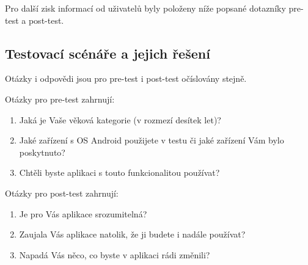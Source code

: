 \documentclass[thesis=B,czech]{FITthesis}[2013/10/20]
\begin{document}
Pro další zisk informací od uživatelů byly položeny níže popsané dotazníky pre-test a post-test.

\subsection{Testovací scénáře a jejich řešení}

Otázky i odpovědi jsou pro pre-test i post-test očíslovány stejně.

Otázky pro pre-test zahrnují:
\begin{enumerate}
  \item Jaká je Vaše věková kategorie (v rozmezí desítek let)?
  \item Jaké zařízení s OS Android použijete v testu či jaké zařízení Vám bylo poskytnuto?
  \item Chtěli byste aplikaci s touto funkcionalitou používat?
\end{enumerate}

Otázky pro post-test zahrnují:
\begin{enumerate}
  \item Je pro Vás aplikace srozumitelná?
  \item Zaujala Vás aplikace natolik, že ji budete i nadále používat?
  \item Napadá Vás něco, co byste v aplikaci rádi změnili?
\end{enumerate}
\end{document}
